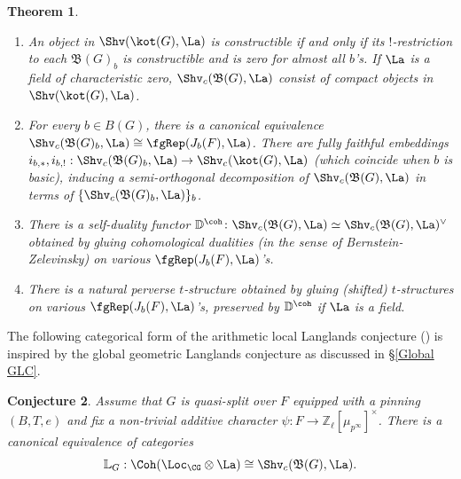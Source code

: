 \documentclass[11pt]{amsart}
\newtheorem{thm}{Theorem}[subsection]
\newtheorem{conjecture}[thm]{Conjecture}
\theoremstyle{definition}
\theoremstyle{definition}
\theoremstyle{definition}
\numberwithin{equation}{section}
\newcommand{\frakB}{{\mathfrak B}}
\newcommand{\bD}{{\mathbb D}}
\newcommand{\bL}{{\mathbb L}}
\newcommand{\bZ}{{\mathbb Z}}
\begin{document}
\begin{thm}\label{T: Local-Langlands-Category}
\begin{enumerate}
    \item An object  in $\Shv(\kot(G),\La)$ is constructible if and only if its $!$-restriction to each $\frakB(G)_b$ is constructible and is zero for almost all $b$'s. If $\La$ is a field of characteristic zero, $\Shv_{c}(\frakB(G),\La)$ consist of compact objects in $\Shv(\kot(G),\La)$. 
    \item For every $b\in B(G)$, there is a canonical equivalence 
    $\Shv_c(\frakB(G)_b,\La)\cong \fgRep(J_b(F),\La)$. There are fully faithful embeddings $i_{b,*}, i_{b,!}:  \Shv_c(\frakB(G)_b,\La)\to \Shv_c(\kot(G),\La)$  (which coincide when $b$ is basic), inducing a semi-orthogonal decomposition of $\Shv_c(\frakB(G),\La)$ in terms of $\{\Shv_c(\frakB(G)_b,\La)\}_b$.     
    \item There is a self-duality functor
    $\bD^{\coh}\colon \Shv_c(\frakB(G),\La)\simeq \Shv_c(\frakB(G),\La)^{\vee}$ obtained by gluing cohomological dualities (in the sense of Bernstein-Zelevinsky) on various $\fgRep(J_b(F),\La)$'s.
    \item There is a natural perverse $t$-structure obtained by gluing (shifted) $t$-structures on various $\fgRep(J_b(F),\La)$'s, preserved by $\bD^{\coh}$ if $\La$ is a field. 
\end{enumerate} 
\end{thm}

The following categorical form of the arithmetic local Langlands conjecture (\cite[Sect. 4.6]{Zhu-Conjecture}) is inspired by the global geometric Langlands conjecture as discussed in \S \ref{Global GLC}.

\begin{conjecture}\label{C: LLC}
Assume that $G$ is quasi-split over $F$ equipped with a pinning $(B,T,e)$ and fix a non-trivial additive character $\psi: F\to \bZ_\ell[\mu_{p^\infty}]^\times$.
There is a canonical equivalence of categories
\[
\bL_{G}:   \Coh(\Loc_{\CG}\otimes\La)\cong \Shv_{c}(\frakB(G),\La). 
\]
\end{conjecture}
\end{document}

